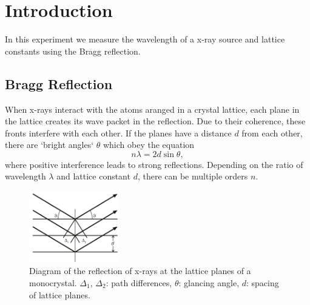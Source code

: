 \section{Introduction}
\label{sec:introduction}
In this experiment we measure the wavelength of a x-ray source and lattice constants using the Bragg
reflection.

\subsection{Bragg Reflection}
\label{sec:Bragg Reflection}
When x-rays interact with the atoms aranged in a crystal lattice, each plane in the lattice creates
its wave packet in the reflection. Due to their coherence, these fronts interfere with each other.
If the planes have a distance $d$ from each other, there are `bright angles` $\theta$ which obey the
equation
\begin{equation}
  n\lambda = 2d \sin\theta,
\end{equation}
where positive interference leads to strong reflections. Depending on the ratio of wavelength
$\lambda$ and lattice constant $d$, there can be multiple orders $n$.

\begin{figure}
  \centering
  \includegraphics[width=0.35\textwidth]{media/bragg.png}
  \caption{Diagram of the reflection of x-rays at the lattice planes of a
    monocrystal.
    $\Delta_1$, $\Delta_2$: path differences,
    $\theta$: glancing angle,
  $d$: spacing of lattice planes. \cite{leybold_manual1,leybold_manual2}}
  \label{fig:SetupAir}
\end{figure}

